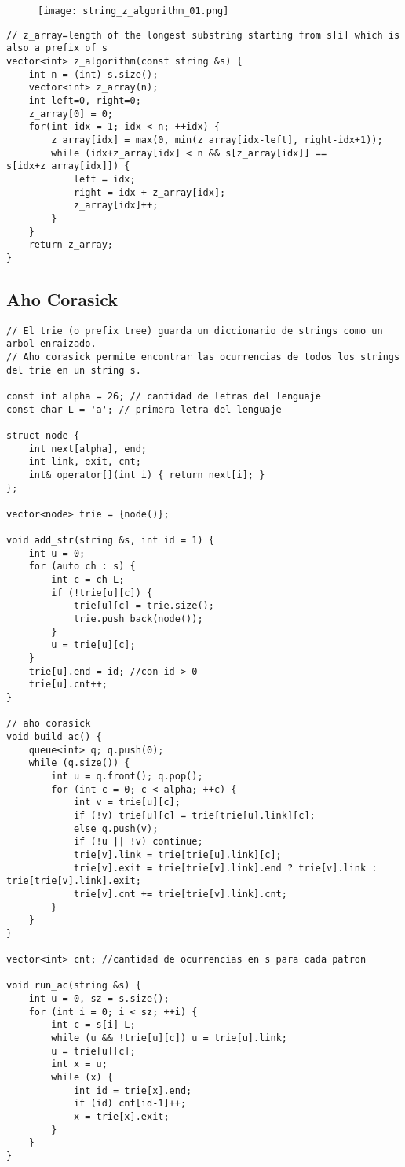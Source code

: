 \documentclass[10pt,letterpaper,twocolumn,twosided]{article}
\begin{document}

\begin{figure}
  \texttt{[image: string\_z\_algorithm\_01.png]}
\end{figure}

\begin{lstlisting}
// z_array=length of the longest substring starting from s[i] which is also a prefix of s
vector<int> z_algorithm(const string &s) {
    int n = (int) s.size();
    vector<int> z_array(n);
    int left=0, right=0;
    z_array[0] = 0;
    for(int idx = 1; idx < n; ++idx) {
        z_array[idx] = max(0, min(z_array[idx-left], right-idx+1));
        while (idx+z_array[idx] < n && s[z_array[idx]] == s[idx+z_array[idx]]) {
            left = idx;
            right = idx + z_array[idx];
            z_array[idx]++;
        }
    }
    return z_array;
}
\end{lstlisting}

\subsection{Aho Corasick}
\begin{lstlisting}
// El trie (o prefix tree) guarda un diccionario de strings como un arbol enraizado.
// Aho corasick permite encontrar las ocurrencias de todos los strings del trie en un string s.

const int alpha = 26; // cantidad de letras del lenguaje
const char L = 'a'; // primera letra del lenguaje

struct node {
    int next[alpha], end;
    int link, exit, cnt;
    int& operator[](int i) { return next[i]; }
};

vector<node> trie = {node()};

void add_str(string &s, int id = 1) {
    int u = 0;
    for (auto ch : s) {
        int c = ch-L;
        if (!trie[u][c]) {
            trie[u][c] = trie.size();
            trie.push_back(node());
        }
        u = trie[u][c];
    }
    trie[u].end = id; //con id > 0
    trie[u].cnt++;
}

// aho corasick
void build_ac() {
    queue<int> q; q.push(0);
    while (q.size()) {
        int u = q.front(); q.pop();
        for (int c = 0; c < alpha; ++c) {
            int v = trie[u][c];
            if (!v) trie[u][c] = trie[trie[u].link][c];
            else q.push(v);
            if (!u || !v) continue;
            trie[v].link = trie[trie[u].link][c];
			trie[v].exit = trie[trie[v].link].end ? trie[v].link : trie[trie[v].link].exit;
            trie[v].cnt += trie[trie[v].link].cnt;
        }
    }
}

vector<int> cnt; //cantidad de ocurrencias en s para cada patron

void run_ac(string &s) {
    int u = 0, sz = s.size();
    for (int i = 0; i < sz; ++i) {
        int c = s[i]-L;
        while (u && !trie[u][c]) u = trie[u].link;
        u = trie[u][c];
        int x = u;
        while (x) {
            int id = trie[x].end;
            if (id) cnt[id-1]++;
            x = trie[x].exit;
        }
    }
}
\end{lstlisting}
\end{document}
